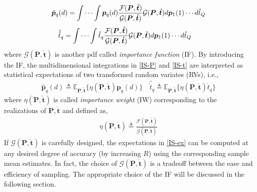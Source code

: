 \documentclass[review]{elsarticle}
\begin{document}
\begin{align}\label{IS-P}
    \hat{\boldsymbol{p}}_q(d)=\idotsint \boldsymbol{p}_q(d) \frac{\mathcal{F}(\boldsymbol{P},\mathring{\boldsymbol{t}})}{\mathcal{G}(\boldsymbol{P},\mathring{\boldsymbol{t}})}\mathcal{G}(\boldsymbol{P},\mathring{\boldsymbol{t}})d\boldsymbol{p}_1(1) \cdots d\mathring{t}_Q
\end{align}
\begin{align}\label{IS-t}    
    \hat{\mathring{t}}_q&=\idotsint \mathring{t}_q \frac{\mathcal{F}(\boldsymbol{P},\mathring{\boldsymbol{t}})}{\mathcal{G}(\boldsymbol{P},\mathring{\boldsymbol{t}})}\mathcal{G}(\boldsymbol{P},\mathring{\boldsymbol{t}})d\boldsymbol{p}_1(1) \cdots d\mathring{t}_Q
\end{align}
where $\mathcal{G}(\boldsymbol{P},\mathring{\boldsymbol{t}})$ is another pdf called \emph{importance function} (IF). By introducing the IF, the multidimensional integrations in \eqref{IS-P} and \eqref{IS-t} are interpreted as statistical expectations of two transformed random variates (RVs), i.e.,
\begin{align}\label{IS-ex}
    \hat{\boldsymbol{p}}_q(d)\triangleq \mathbb{E}_{\boldsymbol{P},\mathring{\boldsymbol{t}}}\{\eta(\boldsymbol{P},\mathring{\boldsymbol{t}})\boldsymbol{p}_q(d)\} \quad \hat{\mathring{t}}_q\triangleq \mathbb{E}_{\boldsymbol{P},\mathring{\boldsymbol{t}}}\{\eta(\boldsymbol{P},\mathring{\boldsymbol{t}})\mathring{t}_q\}
\end{align}
where $\eta(\boldsymbol{P},\mathring{\boldsymbol{t}})$ is called \emph{importance weight} (IW) corresponding to the realizations of $\boldsymbol{P},\mathring{\boldsymbol{t}}$ and defined as,
\begin{align}\label{eta}
    \eta(\boldsymbol{P},\mathring{\boldsymbol{t}})\triangleq\frac{\mathcal{F}(\boldsymbol{P},\mathring{\boldsymbol{t}})}{\mathcal{G}(\boldsymbol{P},\mathring{\boldsymbol{t}})}
\end{align}
If $\mathcal{G}(\boldsymbol{P},\mathring{\boldsymbol{t}})$ is carefully designed, the expectations in \eqref{IS-ex} can be computed at any desired degree of accuracy (by increasing $R$) using the corresponding sample mean estimates. In fact, the choice of $\mathcal{G}(\boldsymbol{P},\mathring{\boldsymbol{t}})$ is a tradeoff between the ease and efficiency of sampling. The appropriate choice of the IF will be discussed in the following section. 
\end{document}
